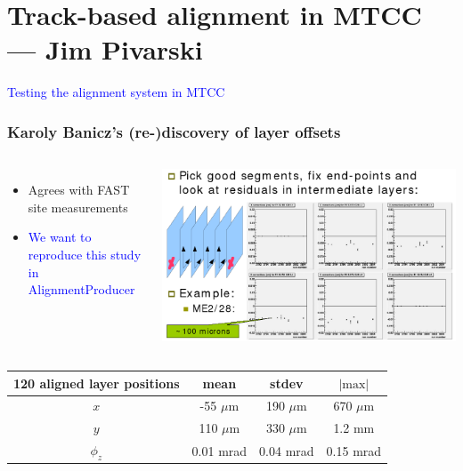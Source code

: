 \documentclass[compress]{beamer}
\begin{document}
\section*{Track-based alignment in MTCC --- Jim Pivarski}

\begin{frame}
\begin{center}
\huge \textcolor{blue}{Testing the alignment system in MTCC}
\end{center}
\end{frame}

\begin{frame}
\frametitle{Karoly Banicz's (re-)discovery of layer offsets}
\begin{columns}
\begin{itemize}
\item Agrees with FAST site measurements
\item \textcolor{blue}{We want to reproduce this study in AlignmentProducer}
\end{itemize}
\includegraphics[width=\linewidth]{realplots/karolys_layers}
\end{columns}

\begin{center}
\begin{tabular}{c | c c c}
120 aligned layer positions & mean & stdev & $|\mbox{max}|$ \\ \hline
$x$ & -55 $\mu$m & 190 $\mu$m & 670 $\mu$m \\
$y$ & 110 $\mu$m & 330 $\mu$m & 1.2 mm \\
$\phi_z$ & 0.01 mrad & 0.04 mrad & 0.15 mrad
\end{tabular}
\end{center}
\end{frame}
\end{document}
